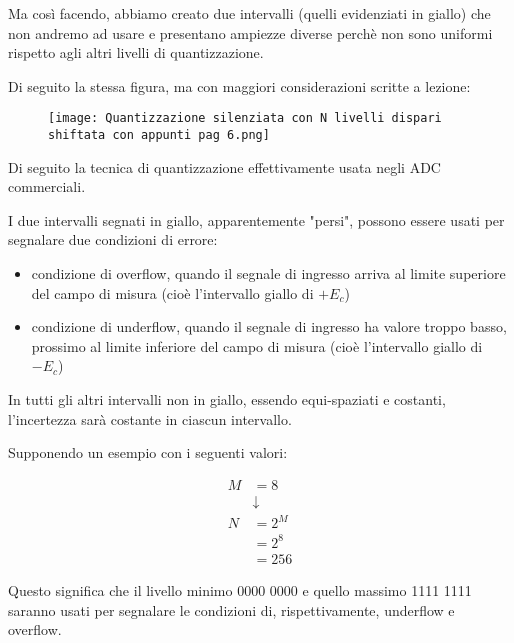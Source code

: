 Ma così facendo, abbiamo creato due intervalli (quelli evidenziati in giallo) 
che non andremo ad usare e presentano ampiezze diverse perchè non sono uniformi 
rispetto agli altri livelli di quantizzazione. \newline 

Di seguito la stessa figura, ma con maggiori considerazioni scritte a lezione: 

\begin{figure}[h]
    \centering
    \texttt{[image: Quantizzazione silenziata con N livelli dispari shiftata con appunti pag 6.png]}
\end{figure}

Di seguito la tecnica di quantizzazione effettivamente usata negli ADC commerciali. \newline 

I due intervalli segnati in giallo, apparentemente "persi", possono essere usati per segnalare due condizioni di errore: 

\begin{itemize}
    \item condizione di overflow, quando il segnale di ingresso arriva al limite superiore del campo di misura (cioè l'intervallo giallo di $+E_c$) 
    \item condizione di underflow, quando il segnale di ingresso ha valore troppo basso, prossimo al limite inferiore del campo di misura (cioè l'intervallo giallo di $-E_c$)
\end{itemize}

In tutti gli altri intervalli non in giallo, essendo equi-spaziati e costanti, l'incertezza sarà costante in ciascun intervallo. \newline 

Supponendo un esempio con i seguenti valori: 

{
    \Large 
    \begin{equation}
        \begin{split}
            M &= 8 
            \\ 
            &\downarrow 
            \\
            N &= 2^{M} 
            \\ 
            &= 2^{8}
            \\
            &= 256
        \end{split}
    \end{equation}
}

Questo significa che il livello minimo 0000 0000 e quello massimo 1111 1111 saranno usati per segnalare 
le condizioni di, rispettivamente, underflow e overflow. \newline 

